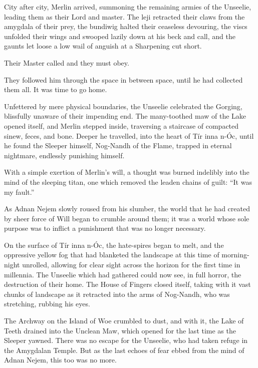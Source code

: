 City after city, Merlin arrived, summoning the remaining armies of the Unseelie, leading them as their Lord and master. The leji retracted their claws from the amygdala of their prey, the bundiwig halted their ceaseless devouring, the viscs unfolded their wings and swooped lazily down at his beck and call, and the gaunts let loose a low wail of anguish at a Sharpening cut short.

Their Master called and they must obey.

They followed him through the space in between space, until he had collected them all. It was time to go home.
\simpleline


Unfettered by mere physical boundaries, the Unseelie celebrated the Gorging, blissfully unaware of their impending end. The many-toothed maw of the Lake opened itself, and Merlin stepped inside, traversing a staircase of compacted sinew, feces, and bone. Deeper he travelled, into the heart of Tír inna n-Óc, until he found the Sleeper himself, Nog-Nandh of the Flame, trapped in eternal nightmare, endlessly punishing himself.

With a simple exertion of Merlin’s will, a thought was burned indelibly into the mind of the sleeping titan, one which removed the leaden chains of guilt: “It was my fault.”

As Adnan Nejem slowly roused from his slumber, the world that he had created by sheer force of Will began to crumble around them; it was a world whose sole purpose was to inflict a punishment that was no longer necessary.

On the surface of Tír inna n-Óc, the hate-spires began to melt, and the oppressive yellow fog that had blanketed the landscape at this time of morning-night unrolled, allowing for clear sight across the horizon for the first time in millennia. The Unseelie which had gathered could now see, in full horror, the destruction of their home. The House of Fingers closed itself, taking with it vast chunks of landscape as it retracted into the arms of Nog-Nandh, who was stretching, rubbing his eyes.

The Archway on the Island of Woe crumbled to dust, and with it, the Lake of Teeth drained into the Unclean Maw, which opened for the last time as the Sleeper yawned. There was no escape for the Unseelie, who had taken refuge in the Amygdalan Temple. But as the last echoes of fear ebbed from the mind of Adnan Nejem, this too was no more.


